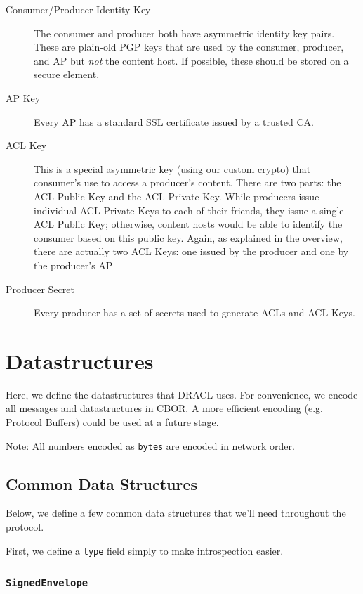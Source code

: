 \documentclass[pdftex,12pt,a4papaer,twoside,notitlepage]{report}
\begin{document}
\begin{description}
\item[Consumer/Producer Identity Key] The consumer and producer both have
  asymmetric identity key pairs. These are plain-old PGP keys that are used by
  the consumer, producer, and AP but \emph{not} the content host. If possible,
  these should be stored on a secure element.
\item[AP Key] Every AP has a standard SSL certificate issued by a trusted CA.
\item[ACL Key] This is a special asymmetric key (using our custom crypto) that
  consumer's use to access a producer's content. There are two parts: the ACL
  Public Key and the ACL Private Key. While producers issue individual ACL
  Private Keys to each of their friends, they issue a single ACL Public Key;
  otherwise, content hosts would be able to identify the consumer based on this
  public key. Again, as explained in the overview, there are actually two ACL
  Keys: one issued by the producer and one by the producer's AP
\item[Producer Secret] Every producer has a set of secrets used to generate ACLs
  and ACL Keys.
\end{description}

\section{Datastructures}

Here, we define the datastructures that DRACL uses. For convenience, we encode
all messages and datastructures in CBOR. A more efficient encoding (e.g.
Protocol Buffers) could be used at a future stage.

Note: All numbers encoded as \texttt{bytes} are encoded in network order.

\subsection{Common Data Structures}

Below, we define a few common data structures that we'll need throughout the
protocol.

First, we define a \texttt{type} field simply to make introspection easier.

\subsubsection{\texttt{SignedEnvelope}}
\end{document}
